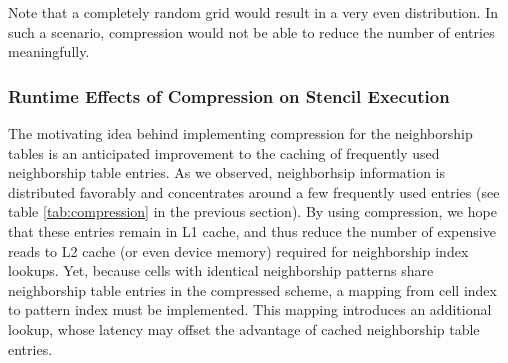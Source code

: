 Note that a completely random grid would result in a very even distribution. In such a scenario, compression would not be able to reduce the number of entries meaningfully. 

\subsubsection{Runtime Effects of Compression on Stencil Execution}

The motivating idea behind implementing compression for the neighborship tables is an anticipated improvement to the caching of frequently used neighborship table entries. As we observed, neighborhsip information is distributed favorably and concentrates around a few frequently used entries (see table \ref{tab:compression} in the previous section). By using compression, we hope that these entries remain in L1 cache, and thus reduce the number of expensive reads to L2 cache (or even device memory) required for neighborship index lookups. Yet, because cells with identical neighborship patterns share neighborship table entries in the compressed scheme, a mapping from cell index to pattern index must be implemented. This mapping introduces an additional lookup, whose latency may offset the advantage of cached neighborship table entries.

